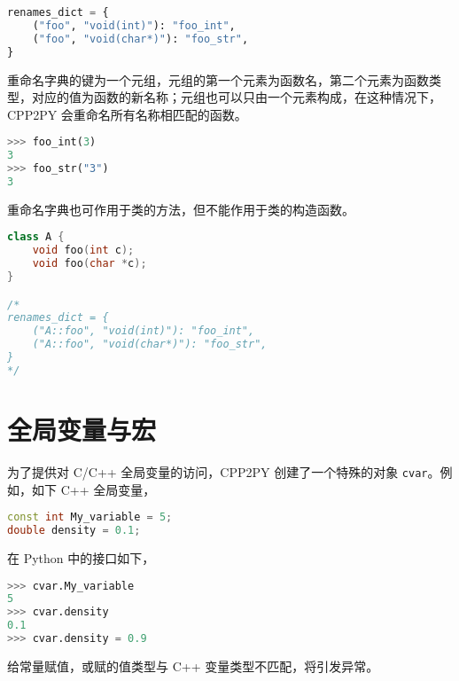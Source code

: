 \begin{framed}
\begin{lstlisting}[language=python]
renames_dict = {
    ("foo", "void(int)"): "foo_int",
    ("foo", "void(char*)"): "foo_str",
}
\end{lstlisting}
\end{framed}

重命名字典的键为一个元组，元组的第一个元素为函数名，第二个元素为函数类型，对应的值为函数的新名称；元组也可以只由一个元素构成，在这种情况下，CPP2PY 会重命名所有名称相匹配的函数。

\begin{framed}
\begin{lstlisting}[language=python]
>>> foo_int(3)
3
>>> foo_str("3")
3
\end{lstlisting}
\end{framed}

重命名字典也可作用于类的方法，但不能作用于类的构造函数。

\begin{framed}
\begin{lstlisting}[language=c++]
class A {
    void foo(int c);
    void foo(char *c);
}

/* 
renames_dict = {
    ("A::foo", "void(int)"): "foo_int",
    ("A::foo", "void(char*)"): "foo_str",
}
*/
\end{lstlisting}
\end{framed}

\section{全局变量与宏}

为了提供对 C/C++ 全局变量的访问，CPP2PY 创建了一个特殊的对象 \lstinline{cvar}。例如，如下 C++ 全局变量，

\begin{framed}
\begin{lstlisting}[language=c++]
const int My_variable = 5;
double density = 0.1;
\end{lstlisting}
\end{framed}在 Python 中的接口如下，\begin{framed}
\begin{lstlisting}[language=python]
>>> cvar.My_variable
5
>>> cvar.density
0.1
>>> cvar.density = 0.9
\end{lstlisting}
\end{framed}

给常量赋值，或赋的值类型与 C++ 变量类型不匹配，将引发异常。

